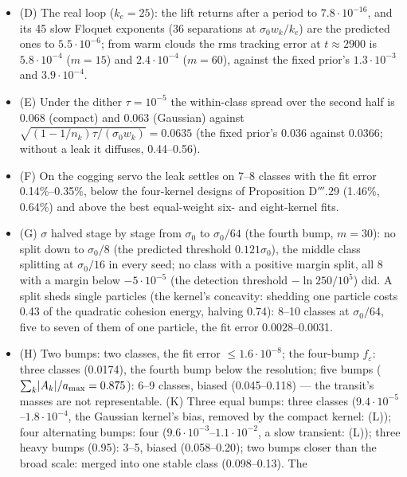 \begin{itemize}
    compact kernel without the broad stage at 17--22. (J) At a fixed Gaussian scale it does not: 4--6 classes at
    $R=1$, three biased classes at $R=2$; three other annealed schedules end at three classes.
  \item (D) The real loop ($k_e=25$): the lift returns after a period to $7.8\cdot10^{-16}$, and its 45 slow Floquet
    exponents (36 separations at $\sigma_0w_k/k_e$) are the predicted ones to $5.5\cdot10^{-6}$; from warm clouds the
    rms tracking error at $t\approx2900$ is $5.8\cdot10^{-4}$ ($m=15$) and $2.4\cdot10^{-4}$ ($m=60$), against the
    fixed prior's $1.3\cdot10^{-3}$ and $3.9\cdot10^{-4}$.
  \item (E) Under the dither $\tau=10^{-5}$ the within-class spread over the second half is 0.068 (compact) and 0.063
    (Gaussian) against $\sqrt{(1-1/n_k)\tau/(\sigma_0w_k)}=0.0635$ (the fixed prior's 0.036 against 0.0366; without a
    leak it diffuses, 0.44--0.56).
  \item (F) On the cogging servo the leak settles on 7--8 classes with the fit error 0.14\%--0.35\%, below the
    four-kernel designs of Proposition D$'''$.29 (1.46\%, 0.64\%) and above the best equal-weight six- and
    eight-kernel fits.
  \item (G) $\sigma$ halved stage by stage from $\sigma_0$ to $\sigma_0/64$ (the fourth bump, $m=30$): no split down
    to $\sigma_0/8$ (the predicted threshold $0.121\sigma_0$), the middle class splitting at $\sigma_0/16$ in every
    seed; no class with a positive margin split, all 8 with a margin below $-5\cdot10^{-5}$ (the detection threshold
    $-\ln250/10^5$) did. A split sheds single particles (the kernel's concavity: shedding one particle costs 0.43 of
    the quadratic cohesion energy, halving 0.74): 8--10 classes at $\sigma_0/64$, five to seven of them of one
    particle, the fit error 0.0028--0.0031.
  \item (H) Two bumps: two classes, the fit error $\le1.6\cdot10^{-8}$; the four-bump $f_\varepsilon$: three classes
    (0.0174), the fourth bump below the resolution; five bumps ($\sum_k\lvert A_k\rvert/a_{\max}=0.875$): 6--9 classes,
    biased (0.045--0.118) --- the transit's masses are not representable. (K) Three equal bumps: three classes
    ($9.4\cdot10^{-5}$--$1.8\cdot10^{-4}$, the Gaussian kernel's bias, removed by the compact kernel: (L)); four
    alternating bumps: four ($9.6\cdot10^{-3}$--$1.1\cdot10^{-2}$, a slow transient: (L)); three heavy bumps (0.95):
    3--5, biased (0.058--0.20); two bumps closer than the broad scale: merged into one stable class (0.098--0.13). The

\end{itemize}
